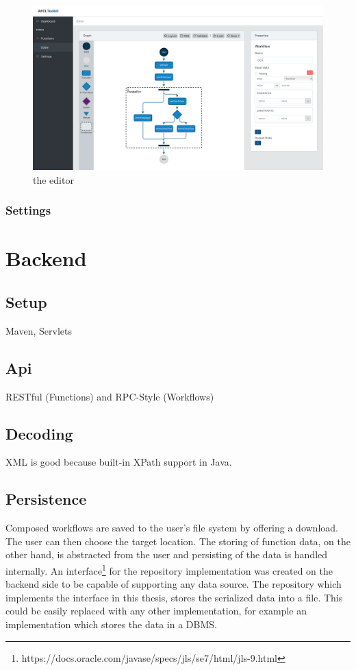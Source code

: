 \documentclass[a4paper,11pt,pdftex,halfparskip,cleardoubleempty,bibtotoc,liststotoc]{scrbook}
\begin{document}
\begin{figure}[H]
  \centering
  \includegraphics[width=\textwidth]{editor}
  \caption{the editor}
\end{figure}

\subsubsection{Settings}

\section{Backend}
\subsection{Setup}
 Maven, Servlets

\subsection{Api}

RESTful (Functions) and RPC-Style (Workflows)

\subsection{Decoding}
 XML is good because built-in XPath support in Java.
\subsection{Persistence}
\label{Backend-Persistence}

Composed workflows are saved to the user's file system by offering a download. The user can then choose the target location.
The storing of function data, on the other hand, is abstracted from the user and persisting of the data is handled internally.
An interface\footnote{https://docs.oracle.com/javase/specs/jls/se7/html/jls-9.html} for the repository implementation was created on the backend side to be capable of supporting any data source. The repository which implements the interface in this thesis, stores the serialized data into a file. This could be easily replaced with any other implementation, for example an implementation which stores the data in a DBMS.
\end{document}
